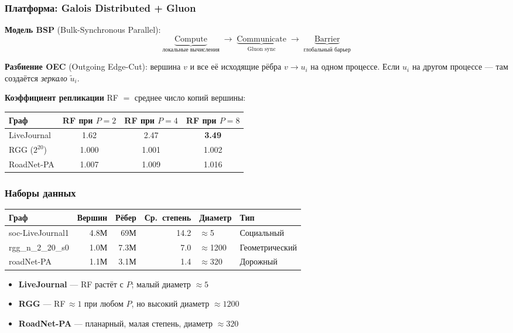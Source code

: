\documentclass[aspectratio=169]{beamer}
\begin{document}
\begin{frame}
  \frametitle{Платформа: Galois Distributed + Gluon}

  \textbf{Модель BSP} (Bulk-Synchronous Parallel):
  \[
    \underbrace{\text{Compute}}_{\text{локальные вычисления}}
    \;\to\;
    \underbrace{\text{Communicate}}_{\text{Gluon sync}}
    \;\to\;
    \underbrace{\text{Barrier}}_{\text{глобальный барьер}}
  \]

  \textbf{Разбиение OEC} (Outgoing Edge-Cut): вершина $v$ и все её
  исходящие рёбра $v \to u_i$ на одном процессе.
  Если $u_i$ на другом процессе --- там создаётся \emph{зеркало} $\tilde{u}_i$.

  \medskip
  \textbf{Коэффициент репликации} RF $=$ среднее число копий вершины:

  \begin{center}
  \small
  \begin{tabular}{lccc}
    \hline
    Граф & RF при $P=2$ & RF при $P=4$ & RF при $P=8$ \\
    \hline
    LiveJournal    & 1.62 & 2.47 & \textbf{3.49} \\
    RGG ($2^{20}$) & 1.000 & 1.001 & 1.002 \\
    RoadNet-PA     & 1.007 & 1.009 & 1.016 \\
    \hline
  \end{tabular}
  \end{center}
\end{frame}

\begin{frame}
  \frametitle{Наборы данных}

  \begin{center}
  \small
  \begin{tabular}{lrrrll}
    \hline
    Граф & Вершин & Рёбер & Ср.\ степень & Диаметр & Тип \\
    \hline
    soc-LiveJournal1  & 4.8М & 69М  & 14.2 & $\approx$5    & Социальный \\
    rgg\_n\_2\_20\_s0 & 1.0М & 7.3М & 7.0  & $\approx$1200 & Геометрический \\
    roadNet-PA        & 1.1М & 3.1М & 1.4  & $\approx$320  & Дорожный \\
    \hline
  \end{tabular}
  \end{center}

  \medskip
  \begin{itemize}
    \item \textbf{LiveJournal} --- RF растёт с $P$;
          малый диаметр $\approx 5$
    \item \textbf{RGG} --- RF\,$\approx 1$ при любом $P$,
          но высокий диаметр $\approx 1200$
    \item \textbf{RoadNet-PA} --- планарный, малая степень, диаметр $\approx 320$
  \end{itemize}
\end{frame}
\end{document}
